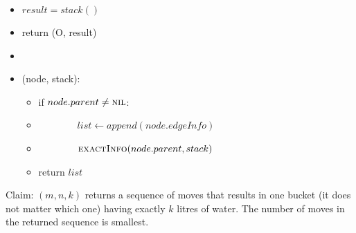 \documentclass[11pt,twoside]{article}
\begin{document}
\begin{enumerate}[leftmargin=0pt]
\begin{enumerate}[topsep=\parsep]
\begin{itemize}
			\begin{itemize}[label = {}]
			\item$result = stack()$ 
			\item return  (O, result)
			\item 
			\item {}(node, stack):
				\begin{itemize}[label = {}]
				\item  if $node.parent \neq \textsc{nil}$: 
				\item \ \ \ \ \ \ \ \ $list \leftarrow append(node.edgeInfo)$
				\item \ \ \ \ \ \ \ \ $\textsc{exactInfo}(node.parent, stack)$
				\item return $list$
				\end{itemize}
			
			\end{itemize}
		
		\end {itemize}
	Claim: $(m, n, k)$ returns a sequence of moves that results in one bucket (it does not matter which one) having exactly $k$ litres of water. The number of moves in the returned sequence is smallest.
		

\end{enumerate}
\end{enumerate}
\end{document}
